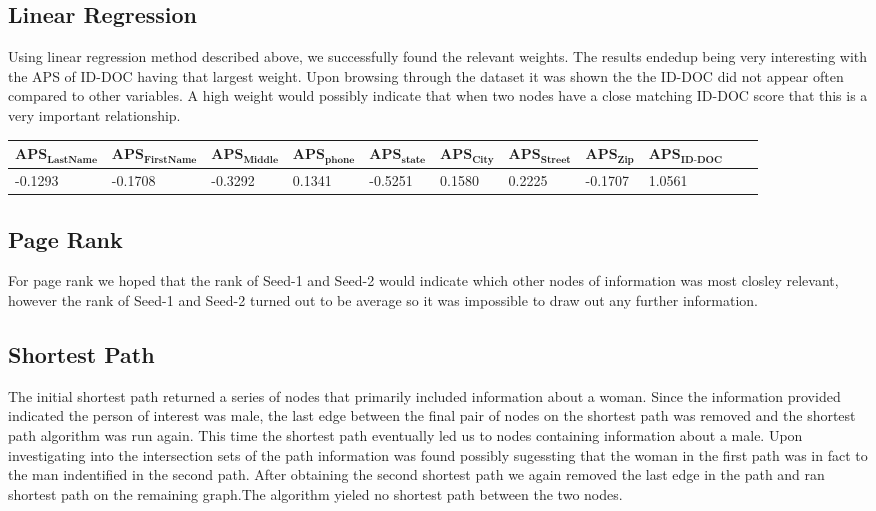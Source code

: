 \documentclass{article} %
\begin{document}
\subsection{Linear Regression}
Using linear regression method described above, we successfully found the relevant weights. The results endedup being very interesting with the APS of ID-DOC having that largest weight. Upon browsing through the dataset it was shown the the ID-DOC did not appear often compared to other variables. A high weight would possibly indicate that when two nodes have a close matching ID-DOC score that this is a very important relationship. 
\begin{table}[h]
\centering
\tiny
\begin{tabular}{|l|l|l|l|l|l|l|l|l|l|l|}
\hline

 $\textbf{APS}_{\textbf{LastName}}$ & $\textbf{APS}_{\textbf{FirstName}}$ &  $\textbf{APS}_{\textbf{Middle}}$ &$\textbf{APS}_{\textbf{phone}}$ & $\textbf{APS}_{\textbf{state}}$ & $\textbf{APS}_{\textbf{City}}$ & $\textbf{APS}_{\textbf{Street}}$ & $\textbf{APS}_{\textbf{Zip}}$ & $\textbf{APS}_{\textbf{ID-DOC}}$   \\ \hline

-0.1293 & -0.1708 &  -0.3292 &0.1341 & -0.5251 & 0.1580 &  0.2225 & -0.1707 & 1.0561  \\ \hline
\end{tabular}
\end{table}

\subsection{Page Rank}
For page rank we hoped that the rank of Seed-1 and Seed-2 would indicate which other nodes of information was most closley relevant, however the rank of Seed-1 and Seed-2 turned out to be average so it was impossible to draw out any further information.


\subsection{Shortest Path}
The initial shortest path returned a series of nodes that primarily included information about a woman. Since the information provided indicated the person of interest was male, the last edge between the final pair of nodes on the shortest path was removed and the shortest path algorithm was run again. This time the shortest path eventually led us to nodes containing information about a male. Upon investigating into the intersection sets of the path information was found possibly sugessting that the woman in the first path was in fact to the man indentified in the second path. After obtaining the second shortest path we again removed the last edge in the path and ran shortest path on the remaining graph.The algorithm yieled no shortest path between the two nodes. 
\end{document}
